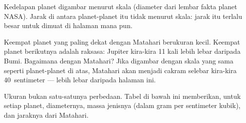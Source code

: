 \begin{omfigure}
\gsixsizes
{}

{\small Kedelapan planet digambar menurut skala (diameter dari lembar fakta
planet NASA). Jarak di antara planet-planet itu tidak menurut skala: jarak
itu terlalu besar untuk dimuat di halaman mana pun.}
\end{omfigure}

Keempat planet yang paling dekat dengan Matahari berukuran kecil. Keempat
planet berikutnya adalah raksasa: Jupiter kira-kira 11 kali lebih lebar
daripada Bumi. Bagaimana dengan Matahari? Jika digambar dengan skala yang
sama seperti planet-planet di atas, Matahari akan menjadi cakram selebar
kira-kira 40~sentimeter --- lebih lebar daripada halaman ini.

Ukuran bukan satu-satunya perbedaan. Tabel di bawah ini memberikan, untuk
setiap planet, diameternya, massa jenisnya (dalam gram per sentimeter
kubik), dan jaraknya dari Matahari.


